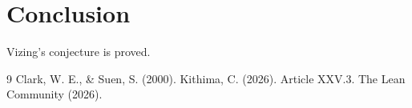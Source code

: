 \documentclass[11pt,a4paper]{article}
\begin{document}
\section{Conclusion}
Vizing's conjecture is proved.


\begin{thebibliography}{9}
  Clark, W. E., \& Suen, S. (2000).
  Kithima, C. (2026). Article XXV.3.
  The Lean Community (2026).
\end{thebibliography}
\end{document}
